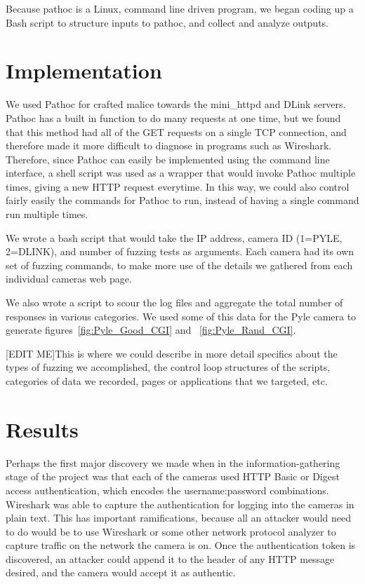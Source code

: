 \documentclass[letterpaper,twocolumn,10pt]{article}
\begin{document}
Because pathoc is a Linux, command line driven program, we began coding up a Bash script to structure inputs to pathoc, and collect and analyze outputs. 


\section{Implementation}

We used Pathoc for crafted malice towards the mini\_httpd and DLink servers. Pathoc has a built in function to do many requests at one time, but we found that this method had all of the GET requests on a single TCP connection, and therefore made it more difficult to diagnose in programs such as Wireshark. Therefore, since Pathoc can easily be implemented using the command line interface, a shell script was used as a wrapper that would invoke Pathoc multiple times, giving a new HTTP request everytime. In this way, we could also control fairly easily the commands for Pathoc to run, instead of having a single command run multiple times.

We wrote a bash script that would take the IP address, camera ID (1=PYLE, 2=DLINK), and number of fuzzing tests as arguments. Each camera had its own set of fuzzing commands, to make more use of the details we gathered from each individual cameras web page.

We also wrote a script to scour the log files and aggregate the total number of responses in various categories. We used some of this data for the Pyle camera to generate figures~\ref{fig:Pyle_Good_CGI} and ~\ref{fig:Pyle_Rand_CGI}. 

 
[EDIT ME]This is where we could describe in more detail specifics about the types of fuzzing we accomplished, the control loop structures of the scripts, categories of data we recorded, pages or applications that we targeted, etc.




\section{Results}


Perhaps the first major discovery we made when in the information-gathering stage of the project was that each of the cameras used HTTP Basic or Digest access authentication, which encodes the username:password combinations. Wireshark was able to capture the authentication for logging into the cameras in plain text. This has important ramifications, because all an attacker would need to do would be to use Wireshark or some other network protocol analyzer to capture traffic on the network the camera is on. Once the authentication token is discovered, an attacker could append it to the header of any HTTP message desired, and the camera would accept it as authentic. 
\end{document}
